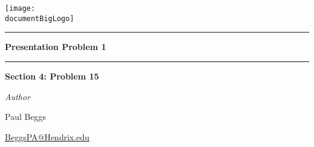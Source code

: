 \documentclass[12pt, oneside]{book}
\newcommand{\documentBigLogo}{../../images/Hendrix Logo.png}
\newcounter{BoxCounter}
\begin{document}



\newcommand{\assignmentname}{Presentation Problem 1}

\newcommand{\cussubtitle}{Section 4: Problem 15}
\newcommand{\finaldate}{September 16, 2025}
\newcommand{\professor}{Dr. Christopher Camfield, Ph.D.}


\begin{titlepage}
    \begin{center}

        \vspace*{-2cm}
        \texttt{[image: \\documentBigLogo]}\\
        \vfill

        \textcolor{horange}{\rule{\textwidth}{1.0pt}}

        \vspace{2em}

        {\huge \textbf{\assignmentname}}

        \vspace{1em} %

        \textcolor{horange}{\rule{\textwidth}{1.0pt}}

        \vspace*{1\baselineskip}

        {\LARGE \textbf{\cussubtitle}}

        \begin{large}
            \vspace*{5\baselineskip}

            \vspace*{1\baselineskip}

            \emph{Author} \\[1ex]
            {\Large Paul Beggs \\ \par} %
            {\href{mailto:BeggsPA@Hendrix.edu}{{BeggsPA@Hendrix.edu}}}\\ %


\end{large}
\end{center}
\end{titlepage}
\end{document}
